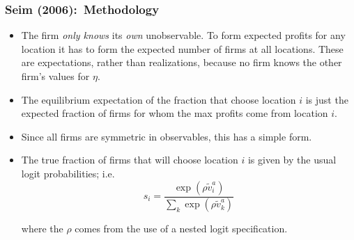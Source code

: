 \begin{frame}%

\frametitle{Seim (2006):\ Methodology}

\begin{itemize}
\item The firm \textit{only knows} its \textit{own} unobservable. To form
expected profits for any location it has to form the expected number of
firms at all locations. These are expectations, rather than realizations,
because no firm knows the other firm's values for $\eta $.

\item The equilibrium expectation of the fraction that choose location $i$
is just the expected fraction of firms for whom the max profits come from
location $i.$

\item Since all firms are symmetric in observables, this has a simple form.

\item The true fraction of firms that will choose location $i$ is given by
the usual logit probabilities; i.e. 
\begin{equation*}
s_{i}=\frac{\exp (\rho \tilde{v}_{i}^{a})}{\sum_{k}\exp (\rho \tilde{v}%
_{k}^{a})}
\end{equation*}

where the $\rho $ comes from the use of a nested logit specification.
\end{itemize}

\end{frame}%

